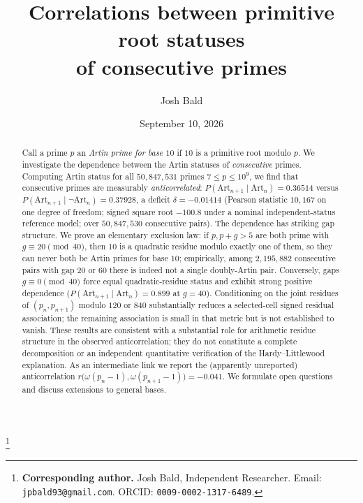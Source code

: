 \documentclass[11pt]{amsart}
\theoremstyle{definition}
\newcommand{\Art}{\mathrm{Art}}
\begin{document}
\title[Correlations between primitive root statuses of consecutive primes]{Correlations between primitive root statuses\\ of consecutive primes}

\author{Josh Bald}
\thanks{\textbf{Corresponding author.} Josh Bald, Independent Researcher.
	Email: \texttt{jpbald93@gmail.com}. ORCID: \texttt{0009-0002-1317-6489}.}

\date{September 10, 2026}


\begin{abstract}
	Call a prime $p$ an \emph{Artin prime for base $10$} if $10$ is a primitive root
	modulo $p$. We investigate the dependence between the Artin
	statuses of \emph{consecutive} primes. Computing Artin status for all
	$50{,}847{,}531$ primes $7 \le p \le 10^9$, we find that consecutive primes are
	measurably \emph{anticorrelated}: $P(\Art_{n+1} \mid \Art_n) = 0.36514$
	versus $P(\Art_{n+1} \mid \lnot\Art_n) = 0.37928$, a deficit
	$\delta = -0.01414$ (Pearson statistic $10{,}167$ on one degree of freedom;
	signed square root $-100.8$ under a nominal independent-status reference model;
	over $50{,}847{,}530$ consecutive pairs).
	The dependence has striking gap structure. We prove an elementary exclusion law:
	if $p, p + g > 5$ are both prime with
	$g \equiv 20 \pmod{40}$, then $10$ is a quadratic residue modulo exactly one of
	them, so they can never both be Artin primes for base $10$; empirically, among
	$2{,}195{,}882$ consecutive pairs with gap $20$ or $60$ there is indeed not a
	single doubly-Artin pair. Conversely, gaps $g \equiv 0 \pmod{40}$ force equal
	quadratic-residue status and exhibit strong positive dependence
	($P(\Art_{n+1} \mid \Art_n) = 0.899$ at $g = 40$). Conditioning on the joint
	residues of $(p_n, p_{n+1})$ modulo $120$ or $840$ substantially reduces a
	selected-cell signed residual association; the remaining association is small in
	that metric but is not established to vanish. These results are consistent with
	a substantial role for arithmetic residue structure in the observed
	anticorrelation; they do not constitute a complete decomposition or an
	independent quantitative verification of the Hardy--Littlewood explanation.
	As an intermediate link we report the (apparently unreported) anticorrelation
	$r\bigl(\omega(p_n - 1), \omega(p_{n+1} - 1)\bigr) = -0.041$.
	We formulate open questions and discuss extensions to general bases.
\end{abstract}
\end{document}
